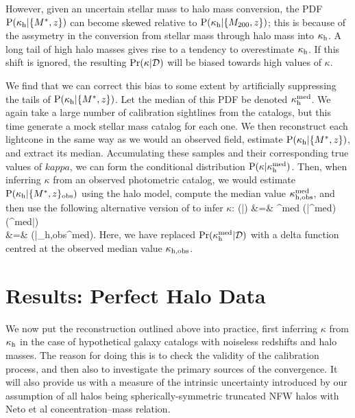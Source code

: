 \documentclass[useAMS,usenatbib]{mn2e}
\begin{document}
However, given an uncertain stellar mass to halo mass conversion, the PDF
${\rm P}(\kappa_{\rm h}|\{M^{*},z\})$ can become skewed relative to
${\rm P}(\kappa_{\rm h}|\{M_{200},z\})$; this is because of the assymetry in the
conversion from stellar mass through halo mass into $\kappa_{\rm h}$. A long tail of
high halo masses gives rise to a tendency to overestimate $\kappa_{\rm h}$.
If this shift is ignored, the resulting $\Pr(\kappa|{\mathcal{D}})$ will be 
biased towards high values of $\kappa$. 

We find that we can correct this bias to some extent by artificially 
suppressing the tails of ${\rm P}(\kappa_{\rm h}|\{M^{*},z\})$. Let the median of
this PDF be denoted $\kappa_{\rm h}^{\rm med}$. We again take a large number of
calibration sightlines from the \MS catalogs, but this time generate a mock
stellar mass catalog for each one. We then reconstruct each lightcone in the
same way as we would an observed field,
estimate ${\rm P}(\kappa_{\rm h}|\{M^{*},z\})$, and extract its median. Accumulating
these samples and their corresponding true values of $kappa$, we can form the 
conditional distribution ${\rm P}(\kappa|\kappa_{\rm h}^{\rm med})$. 
Then, when inferring $\kappa$ from an observed photometric catalog, we would
estimate ${\rm P}(\kappa_{\rm h}|\{M^{*},z\}_{\rm obs})$ 
using the halo model, compute the median value 
$\kappa_{\rm h,obs}^{\rm med}$, and then use the following alternative
version of 
 to infer $\kappa$: 
\bea
\Pr(\kappa|) &=& \int \dee\kappah^{\rm med} 
   \Pr(\kappa|\kappah^{\rm med}) \Pr(\kappah^{\rm med}|) \notag \\
                        &=& \Pr(\kappa|\kappa_{\rm h,obs}^{\rm med}).
\label{eq:calkappaconv}   
\eea
Here, we have replaced $\Pr(\kappa_{\rm h}^{\rm med}|\mathcal{D})$ with a delta
function centred at the observed median value $\kappa_{\rm h,obs}$. 



\section{Results: Perfect Halo Data}
\label{sec:knownMh+z} 

We now put the reconstruction \proceedure outlined above into practice, first
inferring $\kappa$ from $\kappa_{\rm h}$ in the case of hypothetical galaxy catalogs
with noiseless redshifts and halo masses. The reason for doing this is to
check the validity of the calibration process, and then also to  investigate
the primary sources of the convergence. It will also provide us with a measure
of the intrinsic uncertainty introduced by our assumption of all halos being
spherically-symmetric truncated NFW halos with Neto et al concentration--mass
relation.
\end{document}
